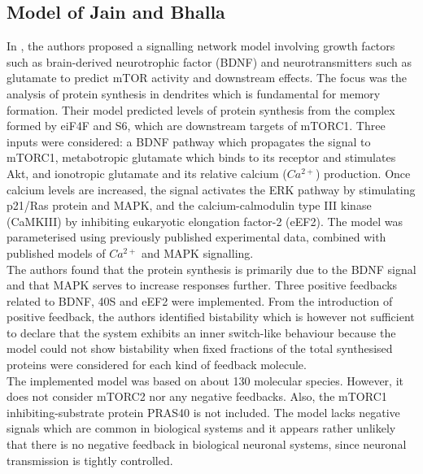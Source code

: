 \subsection{Model of Jain and Bhalla}
\label{subsec:Model of Jain and Bhalla}
In \citep{Jain2009}, the authors proposed a signalling network model involving growth factors such as brain-derived neurotrophic factor (BDNF) and neurotransmitters such as glutamate to predict mTOR activity and downstream effects. The focus was the analysis of protein synthesis in dendrites which is fundamental for memory formation. Their model predicted levels of protein synthesis from the complex formed by eiF4F and S6, which are downstream targets of mTORC1. Three inputs were considered: a BDNF pathway which propagates the signal to mTORC1, metabotropic glutamate which binds to its receptor and stimulates Akt, and ionotropic glutamate and its relative calcium ($Ca^{2+}$) production. Once calcium levels are increased, the signal activates the ERK pathway by stimulating p21/Ras protein and MAPK, and the calcium-calmodulin type III kinase (CaMKIII) by inhibiting eukaryotic elongation factor-2 (eEF2). The model was parameterised using previously published experimental data, combined with published models of 
$Ca^{2+}$ and 
MAPK signalling.\\
The authors found that the protein synthesis is primarily due to the BDNF signal and that MAPK serves to increase responses further. Three positive feedbacks related to BDNF, 40S and eEF2 were implemented. From the introduction of positive feedback, the authors identified bistability which is however not sufficient to declare that the system exhibits an inner switch-like behaviour because the model could not show bistability when fixed fractions of the total synthesised proteins were considered for each kind of feedback molecule.\\
The implemented model was based on about 130 molecular species. However, it does not consider mTORC2 nor any negative feedbacks. Also, the mTORC1 inhibiting-substrate protein PRAS40 is not included. The model lacks negative signals which are common in biological systems and it appears rather unlikely that there is no negative feedback in biological neuronal systems, since neuronal transmission is tightly controlled.

